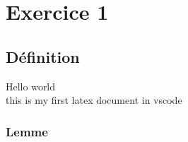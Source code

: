 \section{Exercice 1}
    \subsection{Définition}
        Hello world \cite{einstein}\\
        this is my first latex document in vscode
        \subsubsection{Lemme}